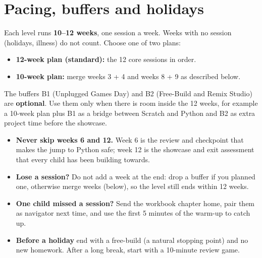 \documentclass[level=1,teacher]{kidscode}
\begin{document}
\section{Pacing, buffers and holidays}
Each level runs \textbf{10--12 weeks}, one session a week. Weeks with no session (holidays, illness)
do not count. Choose one of two plans:
\begin{itemize}[itemsep=2pt]
  \item \textbf{12-week plan (standard):} the 12 core sessions in order.
  \item \textbf{10-week plan:} merge weeks 3 + 4 and weeks 8 + 9 as described below.
\end{itemize}
The buffers B1 (Unplugged Games Day) and B2 (Free-Build and Remix Studio) are \textbf{optional}. Use
them only when there is room inside the 12 weeks, for example a 10-week plan plus B1 as a bridge
between Scratch and Python and B2 as extra project time before the showcase.

\begin{tip}
\begin{itemize}[itemsep=2pt]
  \item \textbf{Never skip weeks 6 and 12.} Week 6 is the review and checkpoint that makes the jump to
        Python safe; week 12 is the showcase and exit assessment that every child has been building towards.
  \item \textbf{Lose a session?} Do not add a week at the end: drop a buffer if you planned one, otherwise
        merge weeks (below), so the level still ends within 12 weeks.
  \item \textbf{One child missed a session?} Send the workbook chapter home, pair them as navigator next
        time, and use the first 5 minutes of the warm-up to catch up.
  \item \textbf{Before a holiday} end with a free-build (a natural stopping point) and no new homework.
        After a long break, start with a 10-minute review game.
\end{itemize}
\end{tip}
\end{document}
